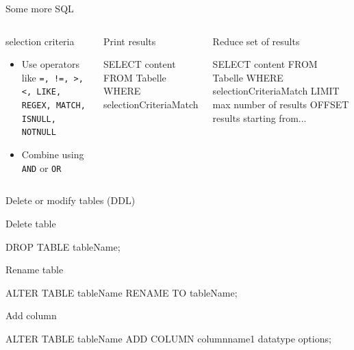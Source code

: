 \begin{frame}[fragile]{Some more SQL}
  \begin{columns}[T,onlytextwidth]
    
      \begin{block}{selection criteria}
        \begin{itemize}\footnotesize
            \item %
            Use operators like \texttt{=, !=, >, <, LIKE, REGEX, MATCH, ISNULL, NOTNULL}
            \item %
            Combine using \texttt{AND} or \texttt{OR}
        \end{itemize}
      \end{block}
      
\begin{block}{Print results}
\begin{sqlcode}
SELECT content 
FROM Tabelle 
WHERE selectionCriteriaMatch
\end{sqlcode}
\end{block}

\begin{block}{Reduce set of results}
  \begin{sqlcode}
SELECT content 
FROM Tabelle 
WHERE selectionCriteriaMatch
LIMIT max number of results
OFFSET results starting from...
\end{sqlcode}
\end{block}

  \end{columns}
\end{frame}


\begin{frame}[fragile]{Delete or modify tables (DDL)}

\begin{block}{Delete table }
  \begin{sqlcode}
  DROP TABLE tableName;
  \end{sqlcode}
\end{block}

\begin{block}{Rename table }
  \begin{sqlcode}
  ALTER TABLE tableName RENAME TO tableName;
  \end{sqlcode}
\end{block}

\begin{block}{Add column}
  \begin{sqlcode}
  ALTER TABLE tableName 
  ADD COLUMN columnname1 datatype options;
  \end{sqlcode}
\end{block}
\end{frame}


